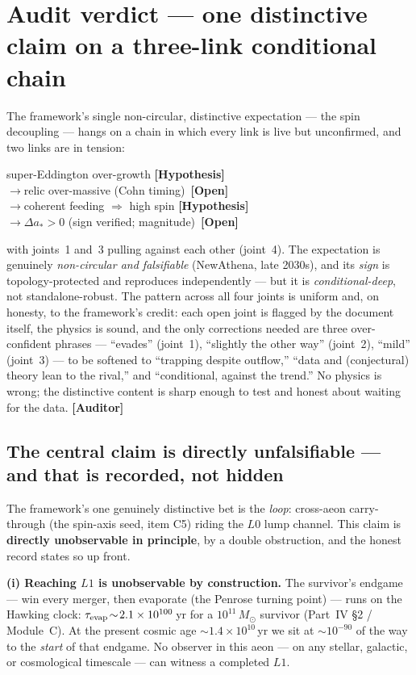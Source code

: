\documentclass[11pt]{article}
\newcommand{\Hyp}{\textbf{\textcolor{blue!55!black}{[Hypothesis]}}}
\newcommand{\Open}{\textbf{\textcolor{gray!10!black}{[Open]}}}
\newcommand{\Auditor}{\textbf{\textcolor{teal!55!black}{[Auditor]}}}
\newcommand{\msun}{M_\odot}
\begin{document}
\section{Audit verdict --- one distinctive claim on a three-link conditional chain}
The framework's single non-circular, distinctive expectation --- the spin decoupling --- hangs on a chain in which every link is live but unconfirmed, and two links are in tension:
\begin{center}\small
super-Eddington over-growth \quad \Hyp \\[2pt]
$\longrightarrow$\quad relic over-massive \quad (Cohn timing)\ \Open \\[2pt]
$\longrightarrow$\quad coherent feeding $\Rightarrow$ high spin \quad \Hyp \\[2pt]
$\longrightarrow$\quad $\Delta a_\ast>0$ \quad (sign verified; magnitude)\ \Open
\end{center}
with joints~1 and~3 pulling against each other (joint~4). The expectation is genuinely \emph{non-circular and falsifiable} (NewAthena, late 2030s), and its \emph{sign} is topology-protected and reproduces independently --- but it is \emph{conditional-deep}, not standalone-robust. The pattern across all four joints is uniform and, on honesty, to the framework's credit: each open joint is flagged by the document itself, the physics is sound, and the only corrections needed are three over-confident phrases --- ``evades'' (joint~1), ``slightly the other way'' (joint~2), ``mild'' (joint~3) --- to be softened to ``trapping despite outflow,'' ``data and (conjectural) theory lean to the rival,'' and ``conditional, against the trend.'' No physics is wrong; the distinctive content is sharp enough to test and honest about waiting for the data. \Auditor



\subsection{The central claim is directly unfalsifiable --- and that is recorded, not hidden}
The framework's one genuinely distinctive bet is the \emph{loop}: cross-aeon carry-through (the spin-axis seed, item C5) riding the $L0$ lump channel. This claim is \textbf{directly unobservable in principle}, by a double obstruction, and the honest record states so up front.

\textbf{(i) Reaching $L1$ is unobservable by construction.} The survivor's endgame --- win every merger, then evaporate (the Penrose turning point) --- runs on the Hawking clock: $\tau_{\rm evap}\!\sim\!2.1\times10^{100}$\,yr for a $10^{11}\,\msun$ survivor (Part~IV \S2 / Module~C). At the present cosmic age $\sim\!1.4\times10^{10}$\,yr we sit at $\sim\!10^{-90}$ of the way to the \emph{start} of that endgame. No observer in this aeon --- on any stellar, galactic, or cosmological timescale --- can witness a completed $L1$.
\end{document}
